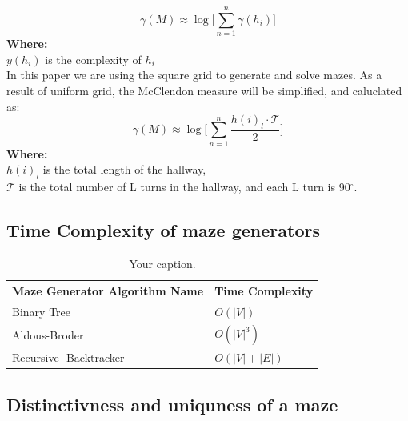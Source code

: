 \begin{equation}
\gamma(M) \approx \log \bigl[\sum_{n =1}^{n}\gamma(h_i)\bigr]
\end{equation}
\textbf{Where:}\\
$y(h_i)$ is the complexity of $h_i$\\ 
\newline
In this paper we are using the square grid to generate and solve mazes. As a result of uniform grid, the McClendon measure will be simplified, and caluclated as:
\begin{equation}
 \gamma(M) \approx \log  \bigl[\sum_{n =1}^{n}\frac{h(i)_l\cdot \mathcal{T}}{2}\bigr]
\end{equation}
\textbf{Where:}\\
$h(i)_l$ is the total length of the hallway,\\
$\mathcal{T}$ is the total number of L turns in the hallway, and each L turn is 90$^\circ$.


\subsection{Time Complexity of maze generators}

  \begin{table}[!h]
    \begin{center}
  \begin{tabular}{ |p{6cm}||p{3cm}|  }
    \hline
    Maze Generator Algorithm  Name& Time Complexity\\
    \hline
    Binary Tree  & $O(|V|)$\\
    Aldous-Broder& $O(|V|^3)$ \\
    Recursive- Backtracker& $O(|V|+|E|)$\\
    \hline
   \end{tabular}
   \caption{\label{tab:table-name}Your caption.}
  \end{center}
  \end{table}

\subsection{Distinctivness and uniquness of a maze}


